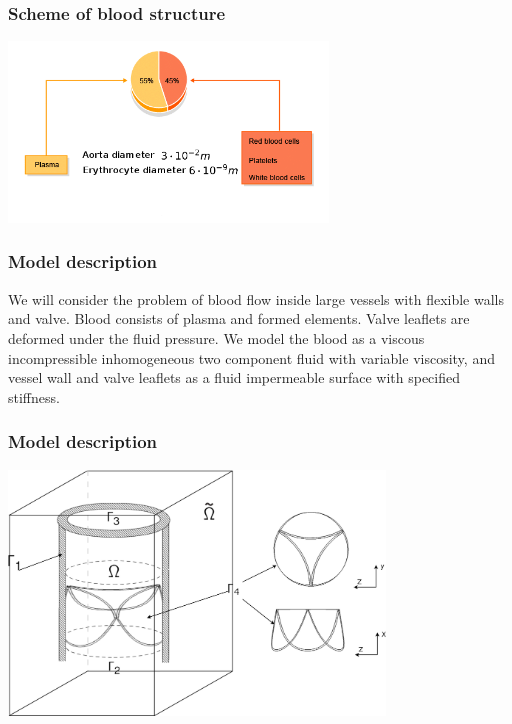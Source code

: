 \documentclass[14pt]{beamer}
\begin{document}
\begin{frame}
\frametitle{Scheme of blood structure}
    \begin{center}
        \includegraphics[width=8.5cm]{blood_scheme3.png}
    \end{center}
\end{frame}

\begin{frame}
\frametitle{Model description}
We will consider the problem of blood flow inside large vessels with flexible
walls and valve.  Blood consists of plasma and formed elements. Valve leaflets
are deformed under the fluid pressure.  We model the blood as a viscous
incompressible inhomogeneous two component fluid with variable viscosity, and
vessel wall and valve leaflets as a fluid impermeable surface with specified
stiffness.
\end{frame}

\begin{frame}
\frametitle{Model description}
    \begin{center}
        \includegraphics[width=10cm]{aorta_valve_scheme_flat_computation.png}
    \end{center}
\end{frame}
\end{document}
